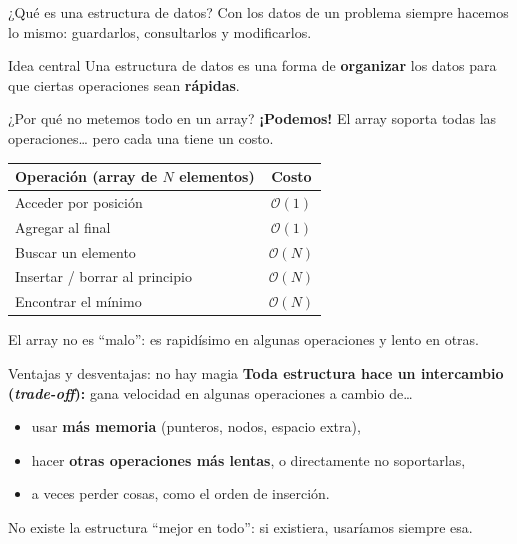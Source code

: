 \documentclass{beamer}
\begin{document}
\begin{frame}{¿Qué es una estructura de datos?}
    Con los datos de un problema siempre hacemos lo mismo:
    guardarlos, consultarlos y modificarlos.

    \vspace{0.3cm}
    \begin{block}{Idea central}
        Una estructura de datos es una forma de \textbf{organizar} los datos
        para que ciertas operaciones sean \textbf{rápidas}.
    \end{block}
\end{frame}


\begin{frame}{¿Por qué no metemos todo en un array?}
    \textbf{¡Podemos!} El array soporta todas las operaciones\ldots{}
    pero cada una tiene un costo.
    \begin{table}
        \centering
        \begin{tabular}{|l|c|}
            \hline
            \textbf{Operación (array de $N$ elementos)} & \textbf{Costo} \\
            \hline
            Acceder por posición & $\mathcal{O}(1)$ \\
            Agregar al final & $\mathcal{O}(1)$ \\
            Buscar un elemento & $\mathcal{O}(N)$ \\
            Insertar / borrar al principio & $\mathcal{O}(N)$ \\
            Encontrar el mínimo & $\mathcal{O}(N)$ \\
            \hline
        \end{tabular}
    \end{table}
    \vspace{0.2cm}
    El array no es ``malo'': es rapidísimo en algunas operaciones
    y lento en otras.
\end{frame}


\begin{frame}{Ventajas y desventajas: no hay magia}
    \textbf{Toda estructura hace un intercambio (\textit{trade-off}):}
    gana velocidad en algunas operaciones a cambio de\ldots
    \begin{itemize}
        \item usar \textbf{más memoria} (punteros, nodos, espacio extra),
        \item hacer \textbf{otras operaciones más lentas}, o directamente no soportarlas,
        \item a veces perder cosas, como el orden de inserción.
    \end{itemize}
    \vspace{0.3cm}
    No existe la estructura ``mejor en todo'':
    si existiera, usaríamos siempre esa.
\end{frame}
\end{document}

